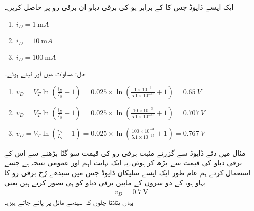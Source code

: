ایک ایسے  ڈایوڈ جس کا   کے برابر ہو کی برقی دباو   ان برقی رو  پر حاصل کریں۔
\begin{enumerate}
\item
$i_D=\SI{1}{\milli A}$
\item
$i_D=\SI{10}{\milli A}$
\item
$i_D=\SI{100}{\milli A}$
\end{enumerate}
حل: مساوات   میں   اور  لیتے ہوئے۔
\begin{enumerate}
\item
$v_D=V_T \ln \left (\frac{i_D}{I_S}+1 \right ) =0.025 \times \ln \left (\frac{1 \times 10^{-3}}{5.1 \times 10^{-15}}+1 \right ) =\SI{0.65}{V}$
\item
$v_D=V_T \ln \left (\frac{i_D}{I_S}+1 \right ) =0.025 \times \ln \left (\frac{10 \times 10^{-3}}{5.1 \times 10^{-15}}+1 \right ) =\SI{0.707}{V}$
\item
$v_D=V_T \ln \left (\frac{i_D}{I_S}+1 \right ) =0.025 \times \ln \left (\frac{100 \times 10^{-3}}{5.1 \times 10^{-15}}+1 \right ) =\SI{0.767}{V}$
\end{enumerate}

مثال میں دئے ڈایوڈ سے گزرتے مثبت برقی رو  کی قیمت  سو گنّا بڑھنے سے اس کے برقی دباو   کی قیمت  سے بڑھ کر  ہوئی۔یہ ایک نہایت اہم اور عمومی نتیجہ ہے جسے استعمال کرتے ہم عام طور ایک ایسے سلیکان ڈایوڈ   جس میں سیدھے رُخ برقی رو کا بہاو ہو، کے دو سروں کے مابین برقی دباو کو   ہی تصور کرتے ہیں یعنی
\begin{align}
v_D=\SI{0.7}{\volt}
\end{align}
یہاں بتلاتا چلوں کہ سیدھے مائل  پر  پائے جاتے ہیں۔  

